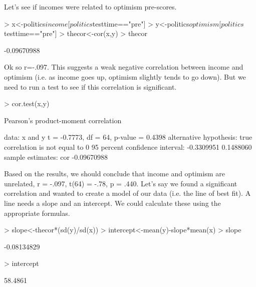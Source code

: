 \documentclass[12pt]{article}
\begin{document}
Let's see if incomes were related to optimism pre-scores.

\begin{Schunk}
\begin{Sinput}
> x<-politics$income[politics$testtime=="pre"]
> y<-politics$optimism[politics$testtime=="pre"]
> thecor<-cor(x,y)
> thecor
\end{Sinput}
\begin{Soutput}
[1] -0.09670988
\end{Soutput}
\end{Schunk}

Ok so r=-.097. This suggests a weak negative correlation between income and optimism (i.e. as
income goes up, optimism slightly tends to go down). But we need to run a test to see if
this correlation is significant.

\begin{Schunk}
\begin{Sinput}
> cor.test(x,y)
\end{Sinput}
\begin{Soutput}
	Pearson's product-moment correlation

data:  x and y
t = -0.7773, df = 64, p-value = 0.4398
alternative hypothesis: true correlation is not equal to 0
95 percent confidence interval:
 -0.3309951  0.1488060
sample estimates:
        cor 
-0.09670988 
\end{Soutput}
\end{Schunk}

Based on the results, we should conclude that income and optimism are unrelated, r = -.097,
t(64) = -.78, p = .440. Let's say we found a significant correlation and wanted to create a model
of our data (i.e. the line of best fit). A line needs a slope and an intercept. We could
calculate these using the appropriate formulas.

\begin{Schunk}
\begin{Sinput}
> slope<-thecor*(sd(y)/sd(x))
> intercept<-mean(y)-slope*mean(x)
> slope
\end{Sinput}
\begin{Soutput}
[1] -0.08134829
\end{Soutput}
\begin{Sinput}
> intercept
\end{Sinput}
\begin{Soutput}
[1] 58.4861
\end{Soutput}
\end{Schunk}
\end{document}
